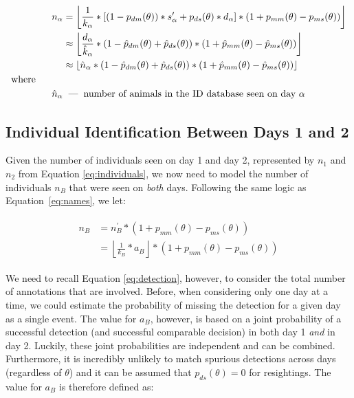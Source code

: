 \begin{align} \label{eq:individuals}
    \begin{split}
        n_{\alpha} &= \left\lfloor \frac{1}{k_{\alpha}} * \lbrack (1 - p_{dm}(\theta))*s^{\prime}_{\alpha} + p_{ds}(\theta)*d_{\alpha}\rbrack * (1 + p_{mm}(\theta) - p_{ms}(\theta)) \right\rfloor  \\
        &\approx \left\lfloor \frac{d_{\alpha}}{\hat{k}_{\alpha}} * (1 - \hat{p}_{dm}(\theta) + \hat{p}_{ds}(\theta)) * (1 + \hat{p}_{mm}(\theta) - \hat{p}_{ms}(\theta)) \right\rfloor \\
        &\approx \left\lfloor \hat{n}_{\alpha} * (1 - \hat{p}_{dm}(\theta) + \hat{p}_{ds}(\theta)) * (1 + \hat{p}_{mm}(\theta) - \hat{p}_{ms}(\theta)) \right\rfloor \\
        \text{where} \hspace{1cm} & \\
        \hat{n}_{\alpha} &\textnormal{\hspace{0.2cm}---\hspace{0.2cm}} \text{number of animals in the ID database seen on day $\alpha$}
    \end{split}
\end{align}

\subsection{Individual Identification Between Days 1 and 2}

Given the number of individuals seen on day 1 and day 2, represented by $n_1$ and $n_2$ from Equation \eqref{eq:individuals}, we now need to model the number of individuals $n_{B}$ that were seen on {\it both} days.  Following the same logic as Equation~\eqref{eq:names}, we let:

\begin{align} \label{eq:both}
    \begin{split}
        n_{B} &= n^{\prime}_{B} * (1 + p_{mm}(\theta) - p_{ms}(\theta)) \\
        &= \left\lfloor \frac{1}{k_{B}} * a_{B} \right\rfloor * (1 + p_{mm}(\theta) - p_{ms}(\theta))
    \end{split}
\end{align}

We need to recall Equation \eqref{eq:detection}, however, to consider the total number of annotations that are involved.  Before, when considering only one day at a time, we could estimate the probability of missing the detection for a given day as a single event.  The value for $a_{B}$, however, is based on a joint probability of a successful detection (and successful comparable decision) in both day 1 {\it and} in day 2.  Luckily, these joint probabilities are independent and can be combined.  Furthermore, it is incredibly unlikely to match spurious detections across days (regardless of $\theta$) and it can be assumed that $p_{ds}(\theta) = 0$ for resightings.  The value for $a_{B}$ is therefore defined as:

